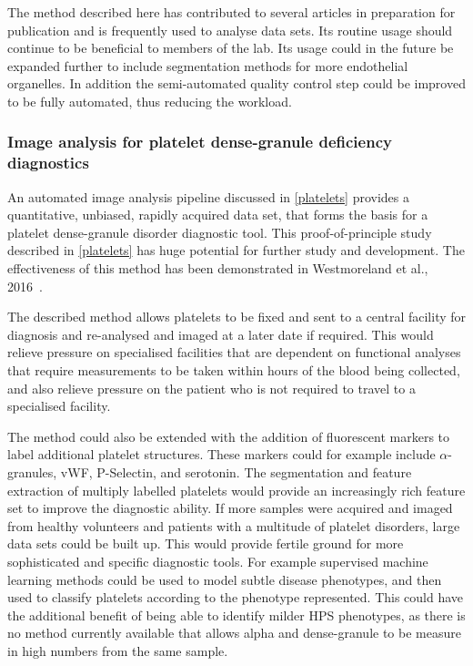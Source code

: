 The method described here has contributed to several articles in preparation for publication and is frequently used to analyse data sets. Its routine usage should continue to be beneficial to members of the lab. Its usage could in the future be expanded further to include segmentation methods for more endothelial organelles. In addition the semi-automated quality control step could be improved to be fully automated, thus reducing the workload.

\subsubsection{Image analysis for platelet dense-granule deficiency diagnostics}
An automated image analysis pipeline discussed in \autoref{platelets} provides a quantitative, unbiased, rapidly acquired data set, that forms the basis for a platelet dense-granule disorder diagnostic tool. This proof-of-principle study described in \autoref{platelets} has huge potential for further study and development. The effectiveness of this method has been demonstrated in Westmoreland et al., 2016~\cite{Westmoreland2016}.

The described method allows platelets to be fixed and sent to a central facility for diagnosis and re-analysed and imaged at a later date if required. This would relieve pressure on specialised facilities that are dependent on functional analyses that require measurements to be taken within hours of the blood being collected, and also relieve pressure on the patient who is not required to travel to a specialised facility. 

The method could also be extended with the addition of fluorescent markers to label additional platelet structures. These markers could for example include $\alpha$-granules, vWF, P-Selectin, and serotonin. The segmentation and feature extraction of multiply labelled platelets would provide an increasingly rich feature set to improve the diagnostic ability. If more samples were acquired and imaged from healthy volunteers and patients with a multitude of platelet disorders, large data sets could be built up. This would provide fertile ground for more sophisticated and specific diagnostic tools. For example supervised machine learning methods could be used to model subtle disease phenotypes, and then used to classify platelets according to the phenotype represented. This could have the additional benefit of being able to identify milder HPS phenotypes, as there is no method currently available that allows alpha and dense-granule to be measure in high numbers from the same sample.

